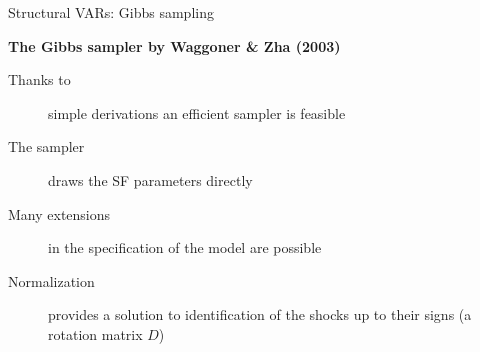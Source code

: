 \documentclass[notes,blackandwhite,mathsans,usenames,dvipsnames]{beamer}
\begin{document}
{
\begin{frame}{\color{mcxs1}Structural VARs: Gibbs sampling}

\textbf{The Gibbs sampler by Waggoner \& Zha (2003)}
\bigskip\begin{description}
\item[Thanks to] {\color{mcxs4}simple derivations an efficient sampler is feasible}

\smallskip\item[The sampler] {\color{mcxs4}draws the SF parameters directly}

\smallskip\item[Many extensions] {\color{mcxs4}in the specification of the model are possible}

\smallskip\item[Normalization] {\color{mcxs4}provides a solution to identification of the shocks up to their signs (a rotation matrix $D$)}
\end{description}
\end{frame}
}
\end{document}

